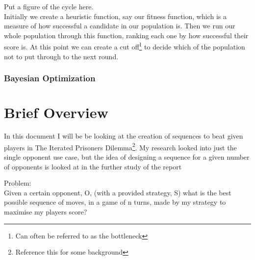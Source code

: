             Put a figure of the cycle here. \label{fig:genetic algo cycle} \\
                       
            Initially we create a heuristic function, say our fitness function, which is a measure of how successful a candidate in our population is. Then we run our whole population through this function, ranking each one by how successful their score is. At this point we can create a cut off\footnote{Can often be referred to as the bottleneck} to decide which of the population not to put through to the next round.\\ 

            

            \subsubsection{Bayesian Optimization}

    \section{Brief Overview}
    In this document I will be be looking at the creation of sequences to beat given players in The Iterated Prisoners Dilemma\footnote{Reference this for some background}. My research looked into just the single opponent use case, but the idea of designing a sequence for a given number of opponents is looked at in the further study of the report

    Problem:\\
    Given a certain opponent, O, (with a provided strategy, S) what is the best possible sequence of moves, in a game of n turns, made by my strategy to maximise my players score?

